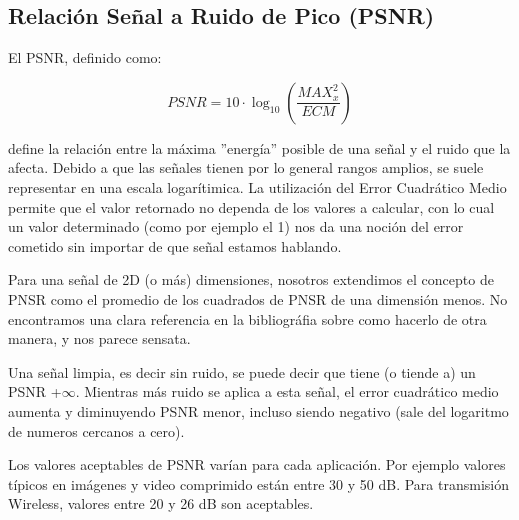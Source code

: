 \subsection {Relaci\'on Se\~nal a Ruido de Pico (PSNR)}

El PSNR, definido como:

$$
\mathit{PSNR} = 10 \cdot \log_{10} \left( \frac{\mathit{MAX}^2_x}{\mathit{ECM}}
\right)
$$

define la relaci\'on entre la m\'axima ''energ\'ia'' posible de una se\~nal y el
ruido que la afecta. Debido a que las se\~nales tienen por lo general rangos
amplios, se suele representar en una escala logar\'itimica. La utilizaci\'on del
 Error Cuadr\'atico Medio permite que el valor retornado no dependa de los
valores a calcular, con lo cual un valor determinado (como por ejemplo el 1) nos
da una noci\'on del error cometido sin importar de que se\~nal estamos hablando.


Para una se\~nal de 2D (o m\'as) dimensiones, nosotros extendimos el concepto de PNSR como
el promedio de los cuadrados de PNSR de una dimensi\'on menos. No encontramos una clara
referencia en la bibliogr\'afia sobre como hacerlo de otra manera, y nos parece sensata.

Una se\~nal limpia, es decir sin ruido, se puede decir que tiene (o tiende a) un PSNR
+$\infty$. Mientras m\'as ruido se aplica a esta se\~nal, el error cuadr\'atico
medio aumenta y diminuyendo PSNR menor, incluso siendo negativo (sale del logaritmo
de numeros cercanos a cero).

Los valores aceptables de PSNR var\'ian para cada aplicaci\'on. Por ejemplo valores t\'ipicos en
im\'agenes y video comprimido est\'an entre 30 y 50 dB. Para transmisi\'on
Wireless, valores entre 20 y 26 dB son aceptables. 
